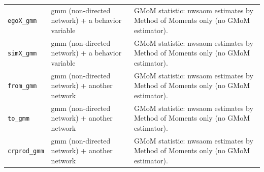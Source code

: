 \begin{longtable}{@{}p{2.8cm}p{4.6cm}p{6.5cm}@{}}
\texttt{egoX\_gmm} & gmm (non-directed network) + a behavior variable & GMoM statistic: nwsaom estimates by Method of Moments only (no GMoM estimator).\\
\texttt{simX\_gmm} & gmm (non-directed network) + a behavior variable & GMoM statistic: nwsaom estimates by Method of Moments only (no GMoM estimator).\\
\texttt{from\_gmm} & gmm (non-directed network) + another network & GMoM statistic: nwsaom estimates by Method of Moments only (no GMoM estimator).\\
\texttt{to\_gmm} & gmm (non-directed network) + another network & GMoM statistic: nwsaom estimates by Method of Moments only (no GMoM estimator).\\
\texttt{crprod\_gmm} & gmm (non-directed network) + another network & GMoM statistic: nwsaom estimates by Method of Moments only (no GMoM estimator).\\
\bottomrule
\end{longtable}
\normalsize


